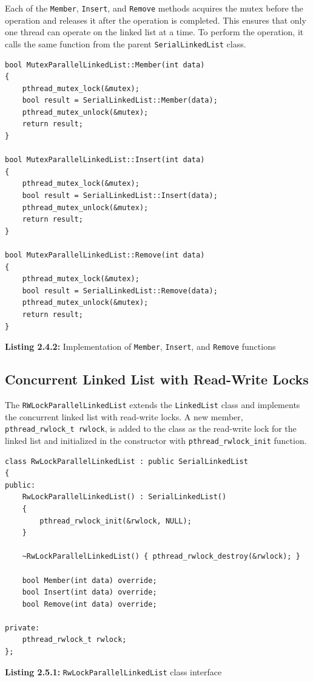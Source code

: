 \documentclass[a4paper,12pt]{article}
\begin{document}
Each of the \lstinline|Member|, \lstinline|Insert|, and \lstinline|Remove| methods acquires the mutex before the operation and releases it after the operation is completed. This ensures that only one thread can operate on the linked list at a time. To perform the operation, it calls the same function from the parent \lstinline|SerialLinkedList| class.

\begin{lstlisting}
bool MutexParallelLinkedList::Member(int data)
{
    pthread_mutex_lock(&mutex);
    bool result = SerialLinkedList::Member(data);
    pthread_mutex_unlock(&mutex);
    return result;
}

bool MutexParallelLinkedList::Insert(int data)
{
    pthread_mutex_lock(&mutex);
    bool result = SerialLinkedList::Insert(data);
    pthread_mutex_unlock(&mutex);
    return result;
}

bool MutexParallelLinkedList::Remove(int data)
{
    pthread_mutex_lock(&mutex);
    bool result = SerialLinkedList::Remove(data);
    pthread_mutex_unlock(&mutex);
    return result;
}
\end{lstlisting}
\begin{center}
    \textbf{Listing 2.4.2:} Implementation of \lstinline|Member|, \lstinline|Insert|, and \lstinline|Remove| functions
\end{center}

\subsection{Concurrent Linked List with Read-Write Locks}

The \lstinline|RWLockParallelLinkedList| extends the \lstinline|LinkedList| class and implements the concurrent linked list with read-write locks. A new member, \lstinline|pthread_rwlock_t rwlock|, is added to the class as the read-write lock for the linked list and initialized in the constructor with \lstinline|pthread_rwlock_init| function.

\begin{lstlisting}
class RwLockParallelLinkedList : public SerialLinkedList
{
public:
    RwLockParallelLinkedList() : SerialLinkedList()
    {
        pthread_rwlock_init(&rwlock, NULL);
    }

    ~RwLockParallelLinkedList() { pthread_rwlock_destroy(&rwlock); }

    bool Member(int data) override;
    bool Insert(int data) override;
    bool Remove(int data) override;

private:
    pthread_rwlock_t rwlock;
};
\end{lstlisting}
\begin{center}
    \textbf{Listing 2.5.1:} \lstinline|RwLockParallelLinkedList| class interface
\end{center}
\end{document}
